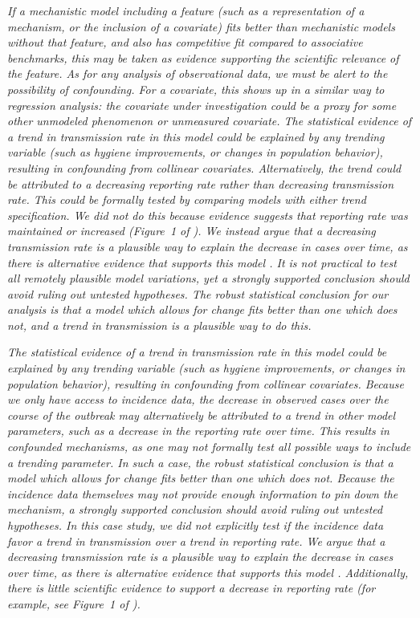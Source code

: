 \documentclass[11pt]{article}
\newcommand\article[1]{{\color{blue} \vspace{1mm}\hspace{0.25in}\parbox{6in}{\em #1}}}
\begin{document}
\article{If a mechanistic model including a feature (such as a representation of a mechanism, or the inclusion of a covariate) fits better than mechanistic models without that feature, and also has competitive fit compared to associative benchmarks, this may be taken as evidence supporting the scientific relevance of the feature. As for any analysis of observational data, we must be alert to the possibility of confounding. For a covariate, this shows up in a similar way to regression analysis: the covariate under investigation could be a proxy for some other unmodeled phenomenon or unmeasured covariate. The statistical evidence of a trend in transmission rate in this model could be explained by any trending variable (such as hygiene improvements, or changes in population behavior), resulting in confounding from collinear covariates. Alternatively, the trend could be attributed to a decreasing reporting rate rather than decreasing transmission rate. This could be formally tested by comparing models with either trend specification. We did not do this because evidence suggests that reporting rate was maintained or increased (Figure~1 of \cite{rebaudet21}). We instead argue that a decreasing transmission rate is a plausible way to explain the decrease in cases over time, as there is alternative evidence that supports this model \cite{rebaudet19CATI,rebaudet21,michel19}. It is not practical to test all remotely plausible model variations, yet a strongly supported conclusion should avoid ruling out untested hypotheses. The robust statistical conclusion for our analysis is that a model which allows for change fits better than one which does not, and a trend in transmission is a plausible way to do this.}

\article{The statistical evidence of a trend in transmission rate in this model could be explained by any trending variable (such as hygiene improvements, or changes in population behavior), resulting in confounding from collinear covariates. Because we only have access to incidence data, the decrease in observed cases over the course of the outbreak may alternatively be attributed to a trend in other model parameters, such as a decrease in the reporting rate over time.
This results in confounded mechanisms, as one may not formally test all possible ways to include a trending parameter. In such a case, the robust statistical conclusion is that a model which allows for change fits better than one which does not. Because the incidence data themselves may not provide enough information to pin down the mechanism, a strongly supported conclusion should avoid ruling out untested hypotheses. In this case study, we did not explicitly test if the incidence data favor a trend in transmission over a trend in reporting rate. We argue that a decreasing transmission rate is a plausible way to explain the decrease in cases over time, as there is alternative evidence that supports this model \cite{rebaudet19CATI,rebaudet21,michel19}. Additionally, there is little scientific evidence to support a decrease in reporting rate (for example, see Figure~1 of \cite{rebaudet21}).}
\end{document}
